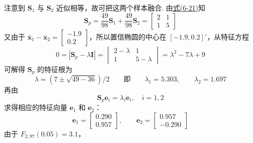 注意到 $\mathbf{S}_1$ 与 $\mathbf{S}_2$ 近似相等，故可把这两个样本融合. 由\hyperref[eq:6-21]{式(6-21)}知
\[
\mathbf{S}_p=\frac{49}{98}\mathbf{S}_1+\frac{49}{98}\mathbf{S}_2=\begin{bmatrix}2&1\\1&5\end{bmatrix}
\]
又由于 $\bar{\mathbf{x}}_1-\bar{\mathbf{x}}_2=\begin{bmatrix}-1.9\\0.2\end{bmatrix}$，所以置信椭圆的中心在 $[-1.9,0.2]'$，从特征方程
\[
0=|\mathbf{S}_p-\lambda\mathbf{I}|=\begin{vmatrix}2-\lambda&1\\1&5-\lambda\end{vmatrix}=\lambda^2-7\lambda+9
\]
可解得 $\mathbf{S}_p$ 的特征根为
\[
\lambda=(7\pm\sqrt{49-36})/2\qquad 即\qquad \lambda_1=5.303,\qquad \lambda_2=1.697
\]
再由
\[
\mathbf{S}_p\mathbf{e}_i=\lambda_i\mathbf{e}_i,\quad i=1,2
\]
求得相应的特征向量 $\mathbf{e}_1$ 和 $\mathbf{e}_2$：
\[
\mathbf{e}_1=\begin{bmatrix}0.290\\0.957\end{bmatrix},\qquad \mathbf{e}_2=\begin{bmatrix}0.957\\-0.290\end{bmatrix}
\]
由于 $F_{2,97}(0.05)=3.1$，
